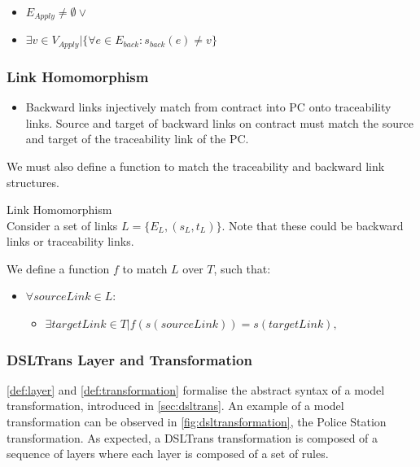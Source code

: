 \begin{itemize}
\item $E_{\textit{Apply}} \neq \emptyset \lor$
\item $ \exists v \in V_{\textit{Apply}} | \big\{\forall e \in E_{back}: s_{back}(e) \neq v \big\}$
\end{itemize}


\subsubsection{Link Homomorphism}

\begin{itemize}
\item Backward links injectively match from contract into PC onto traceability links. Source and target of backward links on contract must match the source and target of the traceability link of the PC.
\end{itemize}

We must also define a function to match the traceability and backward link structures.

\begin{definition}{Link Homomorphism\\}
\label{def:link_homomorphism}
Consider a set of links $L = \{E_{L}, (s_{L}, t_{L})\}$. Note that these could be backward links or traceability links.

We define a function $f$ to match $L$ over $T$, such that:

\begin{itemize}
\item $\forall \mathit{sourceLink} \in L:$
\begin{itemize}
\item $\exists \mathit{targetLink} \in T | f(s(\mathit{sourceLink})) = s(targetLink), $
\end{itemize}
\end{itemize} 
\end{definition}

\subsubsection*{DSLTrans Layer and Transformation}

\cref{def:layer} and \cref{def:transformation} formalise the abstract syntax of a model transformation, introduced in \cref{sec:dsltrans}. An example of a model transformation can be observed in \cref{fig:dsltransformation}, the Police Station transformation. As expected, a DSLTrans transformation is composed of a sequence of layers where each layer is composed of a set of rules.


